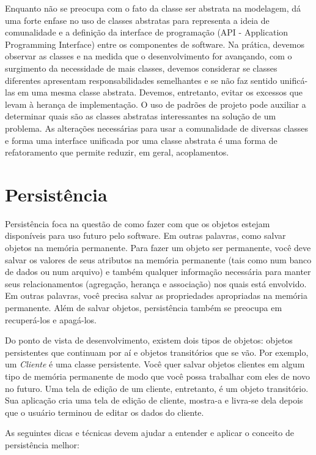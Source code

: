 Enquanto \cite{Ambler:TOP:3ed} não se preocupa com o fato da classe ser abstrata na modelagem, \cite{DP:explained} dá uma forte enfase no uso de classes abstratas para representa a ideia de comunalidade e a definição da interface de programação (API - Application Programming Interface) entre os componentes de software. Na prática, devemos observar as classes e na medida que o desenvolvimento for avançando, com o surgimento da necessidade de mais classes, devemos considerar se classes diferentes apresentam responsabilidades semelhantes e se não faz sentido unificá-las em uma mesma classe abstrata. Devemos, entretanto, evitar os excessos que levam à herança de implementação. O uso de padrões de projeto pode auxiliar a determinar quais são as classes abstratas interessantes na solução de um problema. As alterações necessárias para usar a comunalidade de diversas classes e forma uma interface unificada por uma classe abstrata é uma forma de refatoramento que permite reduzir, em geral, acoplamentos.

\section{Persistência}

Persistência foca na questão de como fazer com que os objetos estejam disponíveis para uso futuro pelo software. Em outras palavras, como salvar objetos na memória permanente. Para fazer um objeto ser permanente, você deve salvar os valores de seus atributos na memória permanente (tais como num banco de dados ou num arquivo) e também qualquer informação necessária para manter seus relacionamentos (agregação, herança e associação) nos quais está envolvido. Em outras palavras, você precisa salvar as propriedades apropriadas na memória permanente. Além de salvar objetos, persistência também se preocupa em recuperá-los e apagá-los.

Do ponto de vista de desenvolvimento, existem dois tipos de objetos: objetos persistentes que continuam por aí e objetos transitórios que se vão. Por exemplo, um \emph{Cliente} é uma classe persistente. Você quer salvar objetos clientes em algum tipo de memória permanente de modo que você possa trabalhar com eles de novo no futuro. Uma tela de edição de um cliente, entretanto, é um objeto transitório. Sua aplicação cria uma tela de edição de cliente, mostra-a e livra-se dela depois que o usuário terminou de editar os dados do cliente.

As seguintes dicas e técnicas devem ajudar a entender e aplicar o conceito de persistência melhor:


